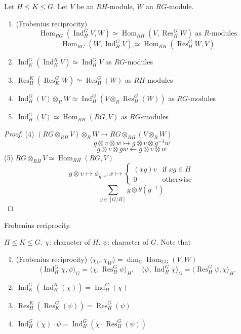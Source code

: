 \documentclass[11pt, a4paper]{report}
\begin{document}
\begin{corollary}
Let $H \leq K \leq G$. Let $V$ be an $RH$-module, $W$ an $RG$-module.
\begin{enumerate}
\item (Frobenius reciprocity)
\[
\operatorname{Hom}_{RG}(\operatorname{Ind}_{H}^{G} V, W) \simeq \operatorname{Hom}_{RH}(V, \operatorname{Res}_{H}^{G} W) \text{ as } R\text{-modules}
\]
\[
\operatorname{Hom}_{RG}(W, \operatorname{Ind}_{H}^{G} V) \simeq \operatorname{Hom}_{RH}(\operatorname{Res}_{H}^{G} W, V)
\]
\item $\operatorname{Ind}_{K}^{G}(\operatorname{Ind}_{H}^{K} V) \simeq \operatorname{Ind}_{H}^{G} V$ as $RG$-modules
\item $\operatorname{Res}_{H}^{K}(\operatorname{Res}_{K}^{G} W) \simeq \operatorname{Res}_{H}^{G}(W)$ as $RH$-modules
\item $\operatorname{Ind}_{H}^{G}(V) \otimes_{R} W \simeq \operatorname{Ind}_{H}^{G}(V \otimes_{R} \operatorname{Res}_{H}^{G}(W))$ as $RG$-modules
\item $\operatorname{Ind}_{H}^{G}(V) \simeq \operatorname{Hom}_{RH}(RG, V)$ as $RG$-modules
\end{enumerate}
\end{corollary}

\begin{proof}
(4) $(RG \otimes_{RH} V) \otimes_{R} W \rightarrow RG \otimes_{RH} (V \otimes_{R} W)$
\[
g \otimes v \otimes w \mapsto g \otimes v \otimes g^{-1} w
\]
\[
g \otimes v \otimes g w \leftarrow g \otimes v \otimes w
\]
(5) $RG \otimes_{RH} V \simeq \operatorname{Hom}_{RH}(RG, V)$
\[
g \otimes v \mapsto \phi_{g,v}: x \mapsto \begin{cases} (xg)v & \text{if } xg \in H \\ 0 & \text{otherwise} \end{cases}
\]
\[
\sum_{g \in [G/H]} g \otimes \theta(g^{-1})
\]
\end{proof}

\begin{corollary}
Frobenius reciprocity.

$H \leq K \leq G$. $\chi$: character of $H$. $\psi$: character of $G$. Note that
\begin{enumerate}
\item (Frobenius reciprocity) $\langle \chi_V, \chi_W \rangle = \dim_{\mathbb{C}} \operatorname{Hom}_{\mathbb{C}G}(V, W)$
\[ \langle \operatorname{Ind}_{H}^{G} \chi, \psi \rangle_{G} = \langle \chi, \operatorname{Res}_{H}^{G} \psi \rangle_{H}, \quad \langle \psi, \operatorname{Ind}_{H}^{G} \chi \rangle_{G} = \langle \operatorname{Res}_{H}^{G} \psi, \chi \rangle_{H}. \]
\item $\operatorname{Ind}_{K}^{G}(\operatorname{Ind}_{H}^{K}(\chi)) = \operatorname{Ind}_{H}^{G}(\chi)$
\item $\operatorname{Res}_{H}^{K}(\operatorname{Res}_{K}^{G}(\psi)) = \operatorname{Res}_{H}^{G}(\psi)$
\item $\operatorname{Ind}_{H}^{G}(\chi) \cdot \psi = \operatorname{Ind}_{H}^{G}(\chi \cdot \operatorname{Res}_{H}^{G}(\psi))$
\end{enumerate}
\end{corollary}
\end{document}
